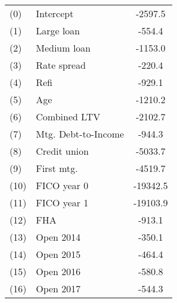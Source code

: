 \begin{tabular}{llc}
(0) & Intercept & -2597.5 \\
(1) & Large loan & -554.4 \\
(2) & Medium loan & -1153.0 \\
(3) & Rate spread & -220.4 \\
(4) & Refi & -929.1 \\
(5) & Age & -1210.2 \\
(6) & Combined LTV & -2102.7 \\
(7) & Mtg. Debt-to-Income & -944.3 \\
(8) & Credit union & -5033.7 \\
(9) & First mtg. & -4519.7 \\
(10) & FICO year 0 & -19342.5 \\
(11) & FICO year 1 & -19103.9 \\
(12) & FHA & -913.1 \\
(13) & Open 2014 & -350.1 \\
(14) & Open 2015 & -464.4 \\
(15) & Open 2016 & -580.8 \\
(16) & Open 2017 & -544.3 \\
\end{tabular}
